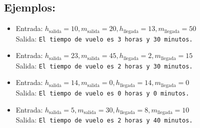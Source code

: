 \begin{enumerate}[label=\alph*)]
    \subsection*{Ejemplos:}
    \begin{itemize}
        \item Entrada: \(h_{\text{salida}} = 10, m_{\text{salida}} = 20, h_{\text{llegada}} = 13, m_{\text{llegada}} = 50\)\\
              Salida: \texttt{El tiempo de vuelo es 3 horas y 30 minutos.}
        \item Entrada: \(h_{\text{salida}} = 23, m_{\text{salida}} = 45, h_{\text{llegada}} = 2, m_{\text{llegada}} = 15\)\\
              Salida: \texttt{El tiempo de vuelo es 2 horas y 30 minutos.}
        \item Entrada: \(h_{\text{salida}} = 14, m_{\text{salida}} = 0, h_{\text{llegada}} = 14, m_{\text{llegada}} = 0\)\\
              Salida: \texttt{El tiempo de vuelo es 0 horas y 0 minutos.}
        \item Entrada: \(h_{\text{salida}} = 5, m_{\text{salida}} = 30, h_{\text{llegada}} = 8, m_{\text{llegada}} = 10\)\\
              Salida: \texttt{El tiempo de vuelo es 2 horas y 40 minutos.}
    \end{itemize}
\end{enumerate}
